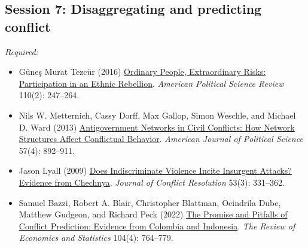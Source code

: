\documentclass[12pt, a4paper]{article}
\begin{document}


\vspace{20pt}
\hline
\subsection*{Session 7: Disaggregating and predicting conflict}

\noindent\textit{Required:}

\begin{itemize}
	\item Güne\c{s} Murat Tezcür (2016) \href{https://doi.org/10.1017/S0003055416000150}{Ordinary People, Extraordinary Risks: Participation in an Ethnic Rebellion}. \textit{American Political Science Review} 110(2): 247--264.
	\item Nils W. Metternich, Cassy Dorff, Max Gallop, Simon Weschle, and Michael D. Ward (2013) \href{https://doi.org/10.1111/ajps.12039}{Antigovernment Networks in Civil Conflicts: How Network Structures Affect Conflictual Behavior}. \textit{American Journal of Political Science} 57(4): 892--911.
	\item Jason Lyall (2009) \href{https://doi.org/10.1177/0022002708330881}{Does Indiscriminate Violence Incite Insurgent Attacks? Evidence from Chechnya}. \textit{Journal of Conflict Resolution} 53(3): 331--362.
	\item Samuel Bazzi, Robert A. Blair, Christopher Blattman, Oeindrila Dube, Matthew Gudgeon, and Richard Peck (2022) \href{https://doi.org/10.1162/rest_a_01016}{The Promise and Pitfalls of Conflict Prediction: Evidence from Colombia and Indonesia}. \textit{The Review of Economics and Statistics} 104(4): 764--779.
\end{itemize}


\end{document}
